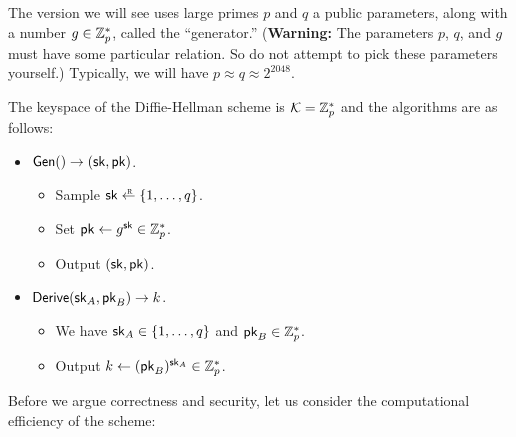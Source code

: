 The version we will see uses large primes $p$ 
and $q$ a public parameters, along with a number $g \in \mathbb{Z}^*_p$,
called the ``generator.''
(\textbf{Warning:} The parameters $p$, $q$, and $g$ must have
some particular relation. So do not attempt to pick these parameters
yourself.)
Typically, we will have $p \approx q \approx 2^{2048}$.

The keyspace of the Diffie-Hellman scheme is $\mathcal{K} = \mathbb{Z}^*_p$
and the algorithms are as follows:
\begin{itemize}[noitemsep]
  \item $\mathsf{Gen}() \to ({\mathsf{sk}}, \mathsf{pk})$.
    \begin{itemize}[noitemsep]
      \item Sample $\sk \getsr \{1, \dots, q\}$.
      \item Set $\mathsf{pk} \gets g^{{\mathsf{sk}}} \in \mathbb{Z}^*_p$.
      \item Output $({\mathsf{sk}}, \mathsf{pk})$.
    \end{itemize}

  \item $\mathsf{Derive}({\mathsf{sk}}_A, \mathsf{pk}_B) \to k$.
    \begin{itemize}[noitemsep]
      \item We have ${\mathsf{sk}}_A \in \{1, \dots, q\}$ and $\mathsf{pk}_B \in \mathbb{Z}^*_p$.
      \item Output $k \gets (\mathsf{pk}_B)^{{\mathsf{sk}}_A} \in \mathbb{Z}^*_p$.
    \end{itemize}
\end{itemize}

Before we argue correctness and security, let us consider
the computational efficiency of the scheme:

